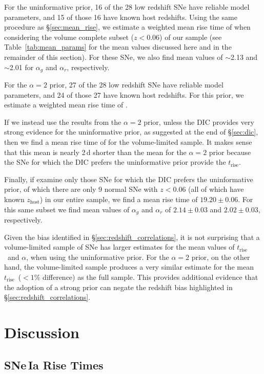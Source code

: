 \documentclass[twocolumn]{./aastex63}
\newcommand{\trise}{$t_\mathrm{rise}$}
\begin{document}
For the uninformative prior, 16 of the 28 low redshift SNe have reliable model
parameters, and 15 of those 16 have known host redshifts. Using the same
procedure as \S\ref{sec:mean_rise}, we estimate a weighted mean rise time of
 when considering the volume complete subset ($z < 0.06$)
of our sample (see Table~\ref{tab:mean_params} for the mean values discussed
here and in the remainder of this section). For these SNe, we also find mean
values of $\sim$2.13 and $\sim$2.01 for $\alpha_g$ and $\alpha_r$,
respectively.

For the $\alpha = 2$ prior, 27 of the 28 low redshift SNe have reliable model
parameters, and 24 of those 27 have known host redshifts. For this prior, we
estimate a weighted mean rise time of .

If we instead use the results from the $\alpha = 2$ prior, unless the DIC
provides very strong evidence for the uninformative prior, as suggested at the
end of \S\ref{sec:dic}, then we find a mean rise time of 
for the volume-limited sample. It makes sense that this mean is nearly 2\,d
shorter than the mean for the $\alpha=2$ prior because the SNe for which the
DIC prefers the uninformative prior provide the  \trise.

Finally, if examine only those SNe for which the DIC prefers the uninformative
prior, of which there are only 9 normal SNe with $z < 0.06$ (all of which have
known $z_\mathrm{host}$) in our entire sample, we find a mean rise time of
$19.20 \pm 0.06$. For this same subset we find mean values of $\alpha_g$ and
$\alpha_r$ of $2.14 \pm 0.03$ and $2.02 \pm 0.03$, respectively.

Given the bias identified in \S\ref{sec:redshift_correlations}, it is not
surprising that a volume-limited sample of SNe has larger estimates for the
mean values of \trise\ and $\alpha$, when using the uninformative prior. For
the $\alpha = 2$ prior, on the other hand, the volume-limited sample produces
a very similar estimate for the mean \trise\ ($< 1\%$ difference) as the full
sample. This provides additional evidence that the adoption of a strong prior
can negate the redshift bias highlighted in \S\ref{sec:redshift_correlations}.

\section{Discussion}

\subsection{SNe\,Ia Rise Times}
\end{document}
